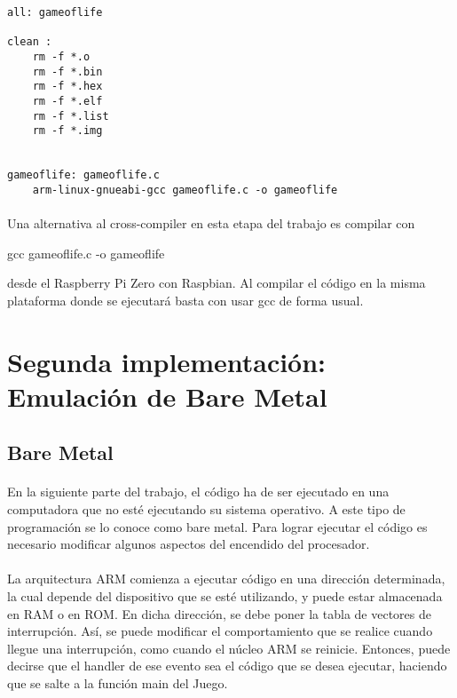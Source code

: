 \documentclass{article}
\begin{document}
\begin{lstlisting}
all: gameoflife

clean :
	rm -f *.o
	rm -f *.bin
	rm -f *.hex
	rm -f *.elf
	rm -f *.list
	rm -f *.img


gameoflife: gameoflife.c
	arm-linux-gnueabi-gcc gameoflife.c -o gameoflife
\end{lstlisting}

\paragraph{}
Una alternativa al cross-compiler en esta etapa del trabajo es compilar con

\begin{commandshell}
gcc gameoflife.c -o gameoflife
\end{commandshell}

desde el Raspberry Pi Zero con Raspbian. Al compilar el c\'odigo en la misma plataforma donde se ejecutar\'a basta con usar gcc de forma usual.

\section{Segunda implementaci\'on: Emulaci\'on de Bare Metal}

\subsection{Bare Metal}

\paragraph{}
En la siguiente parte del trabajo, el c\'odigo ha de ser ejecutado en una computadora que no est\'e ejecutando su sistema operativo. A este tipo de programaci\'on se lo conoce como bare metal.\cite{WikiBareMetal} Para lograr ejecutar el c\'odigo es necesario modificar algunos aspectos del encendido del procesador.

\paragraph{}
La arquitectura ARM comienza a ejecutar c\'odigo en una direcci\'on determinada, la cual depende del dispositivo que se est\'e utilizando, y puede estar almacenada en RAM o en ROM. En dicha direcci\'on, se debe poner la tabla de vectores de interrupci\'on. As\'i, se puede modificar el comportamiento que se realice cuando llegue una interrupci\'on, como cuando el n\'ucleo ARM se reinicie. Entonces, puede decirse que el handler de ese evento sea el c\'odigo que se desea ejecutar, haciendo que se salte a la funci\'on main del Juego.\cite{BalauBareMetal1}
\end{document}
